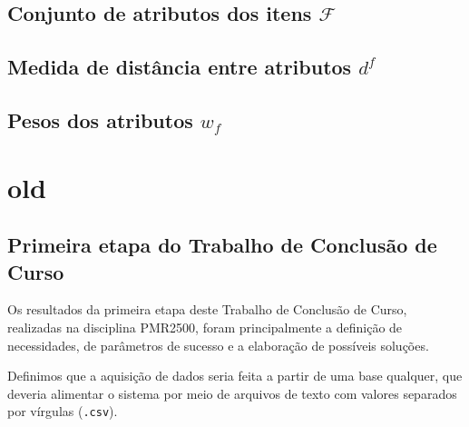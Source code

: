 \section{Conjunto de atributos dos itens
 $\mathcal{F}$} %
\label{sec:conjunto_de_atributos_dos_itens_}


\section{Medida de distância entre atributos $d^f$} %
\label{sec:medida_de_dist_ncia_entre_atributos_}


\section{Pesos dos atributos $w_f$} %
\label{sec:pesos_dos_atributos_}


























\chapter[old]{old}
\label{chap:old}

\section{Primeira etapa do Trabalho de Conclusão de Curso} %
\label{sec:primeira_etapa_do_trabalho_de_conclus_o_de_curso}

Os resultados da primeira etapa deste Trabalho de Conclusão de Curso, realizadas na disciplina PMR2500, foram principalmente a definição de necessidades, de parâmetros de sucesso e a elaboração de possíveis soluções. 

Definimos que a aquisição de dados seria feita a partir de uma base qualquer, que deveria alimentar o sistema por meio de arquivos de texto com valores separados por vírgulas (\texttt{.csv}).

